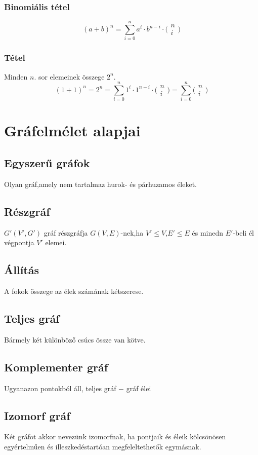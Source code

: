 \documentclass[12pt,a4paper,twoside]{report}
\begin{document}
\subsubsection{Binomiális tétel}
$$(a+b)^n=\sum_{i=0}^{n}a^i\cdot b^{n-i}\cdot\bigl( \begin{smallmatrix*}n\\i\end{smallmatrix*}\bigl)$$
\subsubsection{Tétel}
Minden $n$. sor elemeinek összege $2^n$.
\biz
$$(1+1)^n=2^n=\sum_{i=0}^{n}1^i\cdot 1^{n-i}\cdot\bigl( \begin{smallmatrix*}n\\i\end{smallmatrix*}\bigl)=\sum_{i=0}^{n}\bigl( \begin{smallmatrix*}n\\i\end{smallmatrix*}\bigl)$$
\section{Gráfelmélet alapjai}
\subsection{Egyszerű gráfok}
Olyan gráf,amely nem tartalmaz hurok- és párhuzamos éleket.
\subsection{Részgráf}
$G'(V',G')$ gráf részgráfja $G(V,E)$-nek,ha $V'\leq V$,$E'\leq E$ és minedn $E'$-beli él végpontja $V'$ elemei.
\subsection{Állítás}
A fokok összege az élek számának kétszerese.
\subsection{Teljes gráf}
Bármely két különböző csúcs össze van kötve.
\subsection{Komplementer gráf}
Ugyanazon pontokból áll, teljes gráf $-$ gráf élei
\subsection{Izomorf gráf}
Két gráfot akkor nevezünk izomorfnak, ha pontjaik és éleik kölcsönösen egyértelműen és illeszkedéstartóan megfeleltethetők egymásnak.
\end{document}
